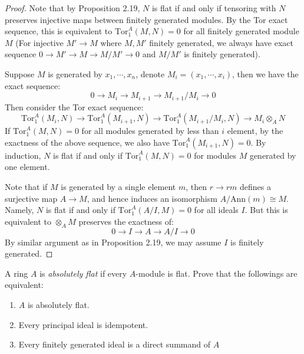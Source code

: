 \documentclass{solution}
\begin{document}
\begin{proof}
    Note that by Proposition 2.19, $N$ is flat if and only if tensoring with $N$ preserves injective maps between finitely generated modules. By the Tor exact sequence, this is equivalent to $\mathrm{Tor}_{1}^{A}(M, N) = 0$ for all finitely generated module $M$ (For injective $M' \rightarrow M$ where $M, M'$ finitely generated, we always have exact sequence $0 \rightarrow M' \rightarrow M \rightarrow M / M' \rightarrow 0$ and $M / M'$ is finitely generated).

    Suppose $M$ is generated by $x_1, \cdots, x_n$, denote $M_i = (x_1, \cdots, x_i)$, then we have the exact sequence:
    $$0 \rightarrow M_i \rightarrow M_{i + 1} \rightarrow M_{i + 1} / M_{i} \rightarrow 0$$
    Then consider the Tor exact sequence:
    $$\mathrm{Tor}_{1}^{A}(M_i, N) \rightarrow \mathrm{Tor}_{1}^{A}(M_{i + 1}, N) \rightarrow \mathrm{Tor}_{1}^{A}(M_{i + 1} / M_i, N) \rightarrow M_i \otimes_A N$$
    If $\mathrm{Tor}_{1}^{A}(M, N) = 0$ for all modules generated by less than $i$ element, by the exactness of the above sequence, we also have $\mathrm{Tor}_{1}^{A}(M_{i + 1}, N) = 0$. By induction, $N$ is flat if and only if $\mathrm{Tor}_{1}^{A}(M, N) = 0$ for modules $M$ generated by one element.
    
    Note that if $M$ is generated by a single element $m$, then $r \rightarrow rm$ defines a surjective map $A \rightarrow M$, and hence induces an isomorphism $A / \mathrm{Ann}(m) \cong M$. Namely, $N$ is flat if and only if $\mathrm{Tor}_{1}^{A}(A / I, M) = 0$ for all ideals $I$. But this is equivalent to $\otimes_A M$ preserves the exactness of:
    $$0 \rightarrow I \rightarrow A \rightarrow A / I \rightarrow 0$$
    By similar argument as in Proposition 2.19, we may assume $I$ is finitely generated.
\end{proof}

\begin{problem}
    A ring $A$ is \textit{absolutely flat} if every $A$-module is flat. Prove that the followings are equivalent:
    \begin{enumerate}
        \item $A$ is absolutely flat.
        \item Every principal ideal is idempotent.
        \item Every finitely generated ideal is a direct summand of $A$
    \end{enumerate}
\end{problem}
\end{document}
